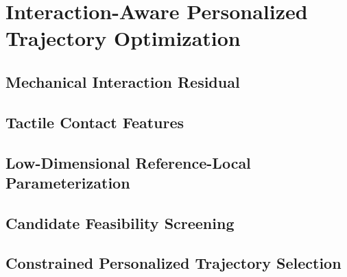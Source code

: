 \section{Interaction-Aware Personalized Trajectory Optimization}

\subsection{Mechanical Interaction Residual}

\subsection{Tactile Contact Features}

\subsection{Low-Dimensional Reference-Local Parameterization}

\subsection{Candidate Feasibility Screening}

\subsection{Constrained Personalized Trajectory Selection}
